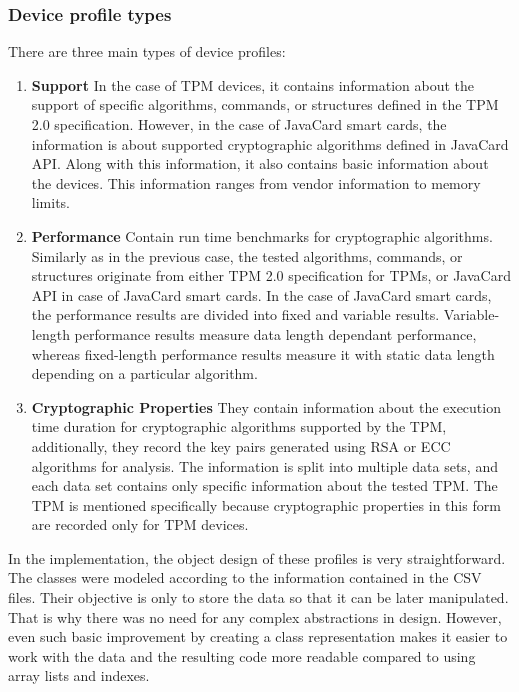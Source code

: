 \subsubsection{Device profile types}
There are three main types of device profiles:
\begin{enumerate}
    \item \textbf{Support} In the case of TPM devices, it contains information about the support of specific algorithms, commands, or structures defined in the TPM 2.0 specification. However, in the case of JavaCard smart cards, the information is about supported cryptographic algorithms defined in JavaCard API. Along with this information, it also contains basic information about the devices. This information ranges from vendor information to memory limits.
    
    \item \textbf{Performance} Contain run time benchmarks for cryptographic algorithms. Similarly as in the previous case, the tested algorithms, commands, or structures originate from either TPM 2.0 specification for TPMs, or JavaCard API in case of JavaCard smart cards. In the case of JavaCard smart cards, the performance results are divided into fixed and variable results. Variable-length performance results measure data length dependant performance, whereas fixed-length performance results measure it with static data length depending on a particular algorithm.
    
    \item \textbf{Cryptographic Properties} They contain information about the execution time duration for cryptographic algorithms supported by the TPM, additionally, they record the key pairs generated using RSA or ECC algorithms for analysis. The information is split into multiple data sets, and each data set contains only specific information about the tested TPM. The TPM is mentioned specifically because cryptographic properties in this form are recorded only for TPM devices.
\end{enumerate}

In the implementation, the object design of these profiles is very straightforward. The classes were modeled according to the information contained in the CSV files. Their objective is only to store the data so that it can be later manipulated. That is why there was no need for any complex abstractions in design. However, even such basic improvement by creating a class representation makes it easier to work with the data and the resulting code more readable compared to using array lists and indexes.


